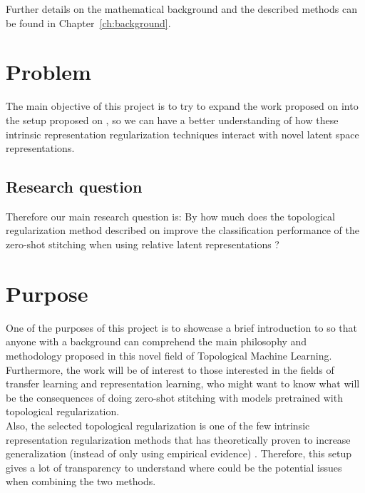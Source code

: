 \documentclass[../main.tex]{subfiles}
\begin{document}
Further details on the mathematical background and the described methods can be found in Chapter~\ref{ch:background}.

\section{Problem}
\label{sec:problem}


The main objective of this project is to try to expand the work proposed on \cite{hofer_densified_2021} into the setup proposed on \cite{moschella_relative_2022}, so we can have a better understanding of how these intrinsic representation regularization techniques interact with novel latent space representations.

\subsection{Research question}
\label{sec:researchQuestion}

Therefore our main research question is: By how much does the topological regularization method described on \cite{hofer_densified_2021} improve the classification performance of the zero-shot stitching when using relative latent representations \cite{moschella_relative_2022}?

\section{Purpose}

One of the purposes of this project is to showcase a brief introduction to  so that anyone with a  background can comprehend the main philosophy and methodology proposed in this novel field of Topological Machine Learning. Furthermore, the work will be of interest to those interested in the fields of transfer learning and representation learning, who might want to know what will be the consequences of doing zero-shot stitching with models pretrained with topological regularization.\\

Also, the selected topological regularization is one of the few intrinsic representation regularization methods that has theoretically proven to increase generalization (instead of only using empirical evidence) \cite{hofer_densified_2021}. Therefore, this setup gives a lot of transparency to understand where could be the potential issues when combining the two methods.
\end{document}
